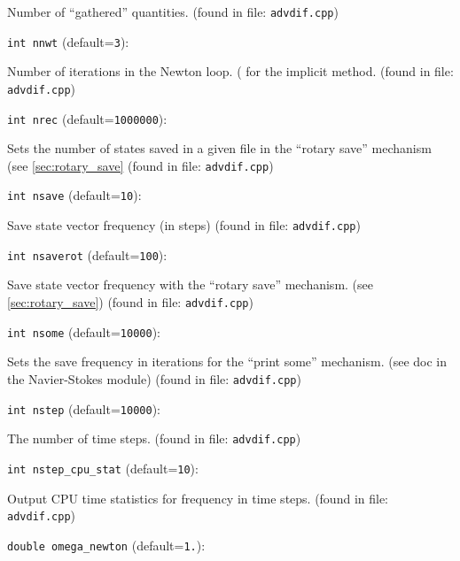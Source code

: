 Number of ``gathered'' quantities.
 (found in file: \verb+advdif.cpp+)
\item\verb+int nnwt+ {\rm(default=\verb|3|)}:

Number of iterations in the Newton loop. (
for the implicit method. 
 (found in file: \verb+advdif.cpp+)
\item\verb+int nrec+ {\rm(default=\verb|1000000|)}:

Sets the number of states saved in a given file
in the ``rotary save'' mechanism (see \ref{sec:rotary_save}
 (found in file: \verb+advdif.cpp+)
\item\verb+int nsave+ {\rm(default=\verb|10|)}:

Save state vector frequency (in steps)
 (found in file: \verb+advdif.cpp+)
\item\verb+int nsaverot+ {\rm(default=\verb|100|)}:

Save state vector frequency with the ``rotary save''
mechanism. (see \ref{sec:rotary_save})
 (found in file: \verb+advdif.cpp+)
\item\verb+int nsome+ {\rm(default=\verb|10000|)}:

Sets the save frequency in iterations for the ``print some''
mechanism. (see doc in the Navier-Stokes module)
 (found in file: \verb+advdif.cpp+)
\item\verb+int nstep+ {\rm(default=\verb|10000|)}:

The number of time steps. 
 (found in file: \verb+advdif.cpp+)
\item\verb+int nstep_cpu_stat+ {\rm(default=\verb|10|)}:

Output CPU time statistics for frequency in time steps. 
 (found in file: \verb+advdif.cpp+)
\item\verb+double omega_newton+ {\rm(default=\verb|1.|)}:

